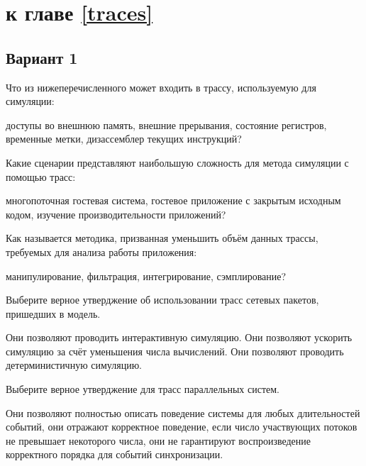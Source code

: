 \section{\Questions к главе \ref{traces}} %

\subsection*{Вариант 1}

\begin{questions}

\question[3] Что из нижеперечисленного может входить в трассу, используемую для симуляции:
\begin{choices}
    \correctchoice доступы во внешнюю память,
    \correctchoice внешние прерывания,
    \choice состояние регистров,
    \correctchoice временные метки,
    \choice дизассемблер текущих инструкций?
\end{choices}

\question[3] Какие сценарии представляют наибольшую сложность для метода симуляции с помощью трасс:
\begin{choices}
\correctchoice многопоточная гостевая система,
\choice гостевое приложение с закрытым исходным кодом,
\choice изучение производительности приложений?
\end{choices}

\question[3] Как называется методика, призванная уменьшить объём данных трассы, требуемых для анализа работы приложения:
\begin{choices}
\choice манипулирование,
\choice фильтрация,
\choice интегрирование,
\correctchoice сэмплирование?
\end{choices}

\question[3] Выберите верное утверджение об использовании трасс сетевых пакетов, пришедших в модель.
\begin{choices}
\choice Они позволяют проводить интерактивную симуляцию.
\choice Они позволяют ускорить симуляцию за счёт уменьшения числа вычислений.
\correctchoice Они позволяют проводить детерминистичную симуляцию.
\end{choices}

\question[3] Выберите верное утверджение для трасс параллельных систем.
\begin{choices}
\choice Они позволяют полностью описать поведение системы для любых длительностей событий,
\choice они отражают корректное поведение, если число участвующих потоков не превышает некоторого числа,
\correctchoice они не гарантируют воспроизведение корректного порядка для событий синхронизации.
\end{choices}


\end{questions}

